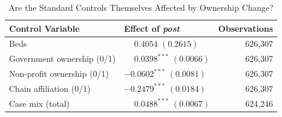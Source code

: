 \documentclass[12pt]{article}
\begin{document}
\begin{table}[H]
\centering
\caption{Are the Standard Controls Themselves Affected by Ownership Change?}
\label{tab:standard-controls-endogeneity}
\small
\setlength{\tabcolsep}{6pt}
\begin{tabularx}{\textwidth}{@{} l Y r @{}}
\toprule
Control Variable & Effect of \textit{post} & Observations \\
\midrule
Beds &  & 626,307 \\
Government ownership (0/1) &  & 626,307 \\
Non-profit ownership (0/1) &  & 626,307 \\
Chain affiliation (0/1) &  & 626,307 \\
Case mix (total) &  & 624,246 \\
\bottomrule
\end{tabularx}
\end{table}
\end{document}
